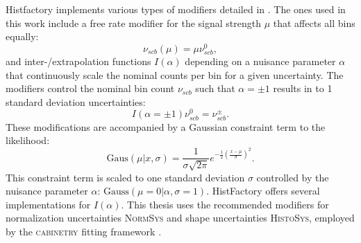 Histfactory implements various types of modifiers detailed in \citep{pyhf_intro,heinrich2019searches,cranmer2012histfactory}. The ones used in this work include a free rate modifier for the signal strength $\mu$ that affects all bins equally:
\begin{equation}
    \nu_{scb}(\mu)=\mu \nu_{scb}^0,
\end{equation}
and inter-/extrapolation functions $I(\alpha)$ depending on a nuisance parameter $\alpha$ that continuously scale the nominal counts per bin for a given uncertainty. The modifiers control the nominal bin count $\nu_{scb}$ such that $\alpha=\pm 1$ results in to 1 standard deviation uncertainties:
\begin{equation}
I(\alpha=\pm 1) \nu_{scb}^0=\nu_{scb}^\pm.
\end{equation}
These modifications are accompanied by a Gaussian constraint term to the likelihood:
\begin{equation}
    \text{Gaus}(\mu|x,\sigma)=\frac{1}{\sigma\sqrt{2\pi}}e^{-\frac{1}{2}\left(\frac{x-\mu}{\sigma}\right)^2}.
\end{equation}
This constraint term is scaled to one standard deviation $\sigma$ controlled by the nuisance parameter $\alpha$: $\mathrm{Gauss}(\mu=0 | \alpha, \sigma=1)$. HistFactory offers several implementations for $I(\alpha)$. This thesis uses the recommended modifiers for normalization uncertainties \textsc{NormSys} and shape uncertainties \textsc{HistoSys}, employed by the \textsc{cabinetry} fitting framework \citep{cranmer_2021_4627038}.


